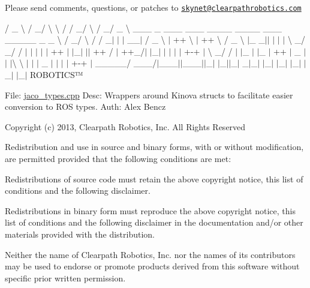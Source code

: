 Please send comments, questions, or patches to \href{mailto:skynet@clearpathrobotics.com}{\tt skynet@clearpathrobotics.\+com}



 / \+\_\+ \textbackslash{} / \+\_\+/ \textbackslash{} \textbackslash{} / / \+\_\+/ \textbackslash{} / \+\_\+/ \+\_\+ \textbackslash{} \+\_\+\+\_\+\+\_\+ \+\_\+ \+\_\+\+\_\+\+\_\+ \+\_\+\+\_\+\+\_\+ \+\_\+\+\_\+\+\_\+\+\_\+ \+\_\+\+\_\+\+\_\+\+\_\+ \+\_\+\+\_\+\+\_\+ \+\_\+\+\_\+\+\_\+\+\_\+\+\_\+ \+\_\+ \+\_\+ \textbackslash{} / \+\_\+/ \textbackslash{} / / \+\_\+$|$ $\vert$ $\vert$ \+\_\+\+\_\+$\vert$ / \+\_\+ \textbackslash{} $\vert$ ++ \textbackslash{} $\vert$ ++ \textbackslash{} / \+\_\+ \textbackslash{} $\vert$\+\_\+ \+\_\+$\vert$$\vert$ $\vert$ $\vert$ $\vert$ \textbackslash{} \+\_\+/ \+\_\+/ / $\vert$ $\vert$ $\vert$ $\vert$ $\vert$ ++ $\vert$ $\vert$\+\_\+$\vert$ $\vert$$\vert$ ++ / $\vert$ ++\+\_\+/$\vert$ $\vert$\+\_\+$\vert$ $\vert$ $\vert$ $\vert$ $\vert$ +-\/+ $\vert$ \textbackslash{} \+\_\+/ / $\vert$ $\vert$\+\_\+ $\vert$ $\vert$\+\_\+ $\vert$ ++ $\vert$ \+\_\+ $\vert$$\vert$ $\vert$\textbackslash{} \textbackslash{} $\vert$ $\vert$ $\vert$ \+\_\+ $\vert$ $\vert$ $\vert$ $\vert$ +-\/+ $\vert$ \+\_\+\+\_\+\+\_\+\+\_\+\+\_\+/ \+\_\+\+\_\+\+\_\+/$\vert$\+\_\+\+\_\+\+\_\+$\vert$$\vert$\+\_\+\+\_\+\+\_\+$\vert$$\vert$\+\_\+$\vert$ $\vert$\+\_\+$\vert$$\vert$\+\_\+$\vert$ \+\_\+$|$\+\_\+$\vert$ $\vert$\+\_\+$\vert$ $\vert$\+\_\+$\vert$ $\vert$\+\_\+$\vert$ $\vert$\+\_\+$\vert$ $\vert$\+\_\+$\vert$ R\+O\+B\+O\+T\+I\+C\+S™

File\+: \hyperlink{jaco__types_8cpp}{jaco\+\_\+types.\+cpp} Desc\+: Wrappers around Kinova structs to facilitate easier conversion to R\+OS types. Auth\+: Alex Bencz

Copyright (c) 2013, Clearpath Robotics, Inc. All Rights Reserved

Redistribution and use in source and binary forms, with or without modification, are permitted provided that the following conditions are met\+:
\begin{DoxyItemize}
\item Redistributions of source code must retain the above copyright notice, this list of conditions and the following disclaimer.
\item Redistributions in binary form must reproduce the above copyright notice, this list of conditions and the following disclaimer in the documentation and/or other materials provided with the distribution.
\item Neither the name of Clearpath Robotics, Inc. nor the names of its contributors may be used to endorse or promote products derived from this software without specific prior written permission.
\end{DoxyItemize}

